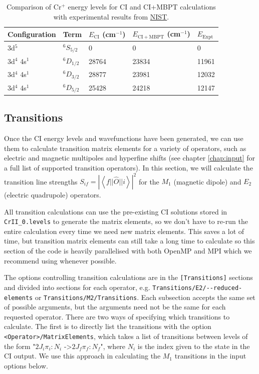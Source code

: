 \documentclass{report}
\begin{document}
\begin{table}
\label{tab:CI_MBPT_comparison}
\caption{Comparison of Cr$^+$ energy levels for CI and CI+MBPT calculations with experimental results
from \href{https://physics.nist.gov/PhysRefData/ASD/levels_form.html}{NIST}.}
\begin{tabular}{l  l  l  l  l}
\hline
Configuration   &Term    &$E_{\mathrm{CI}}$ (cm$^{-1}$)     &$E_{\mathrm{CI+MBPT}}$ (cm$^{-1}$)  & $E_{\mathrm{Expt}}$\\
\hline
\hline
3d$^5$  &$^6S_{5/2}$    &0  &0  &0\\
3d$^4$ 4s$^1$   &$^6D_{1/2}$    &28764   &23834   &11961\\
3d$^4$ 4s$^1$   &$^6D_{3/2}$    &28877   &23981   &12032\\
3d$^4$ 4s$^1$   &$^6D_{5/2}$    &25428   &24218   &12147\\
\hline
\end{tabular}
\end{table}


\subsection{Transitions}

Once the CI energy levels and wavefunctions have been generated, we can use them to calculate transition
matrix elements for a variety of operators, such as electric and magnetic multipoles and hyperfine
shifts (see chapter \ref{chap:input} for a full list of supported transition operators). In this 
section, we will calculate the transition line strengths $S_{if} =
\left|\left<f||\hat{O}||i\right>\right|^2$ for 
the $M_1$ (magnetic dipole) and $E_2$ (electric quadrupole) operators.

All transition calculations can use the pre-existing CI solutions stored in \texttt{CrII\_0.levels} to 
generate the matrix elements, so we don't have to re-run the entire calculation every time we need new
matrix elements. This saves a lot of time, but transition matrix elements can still take a long time to
calculate so this section of the code is heavily parallelised with both OpenMP and MPI which we
recommend using whenever possible.

The options controlling transition calculations are in the \texttt{[Transitions]} sections and divided
into sections for each operator, e.g. \texttt{Transitions/E2/{-}{-}reduced-elements} or 
\texttt{Transitions/M2/Transitions}. Each subsection accepts the same set of possible arguments, but 
the arguments need not be the same for each requested operator. There are two ways of specifying which
transitions to calculate. The first is to directly list the transitions with the option
\texttt{<Operator>/MatrixElements}, which takes a list of transitions between levels of the form
"$2J_i\pi_i:N_i$ -\textgreater $2J_f\pi_f:N_f$", where $N_i$ is the index given to the state in the CI
output. We use this approach in calculating the $M_1$ transitions in the input options below.
\end{document}
